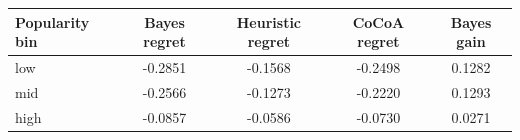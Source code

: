 \begin{tabular}{lcccc}
\toprule
Popularity bin & Bayes regret & Heuristic regret & CoCoA regret & Bayes gain \\
\midrule
low & -0.2851 & -0.1568 & -0.2498 & 0.1282 \\
mid & -0.2566 & -0.1273 & -0.2220 & 0.1293 \\
high & -0.0857 & -0.0586 & -0.0730 & 0.0271 \\
\bottomrule
\end{tabular}
